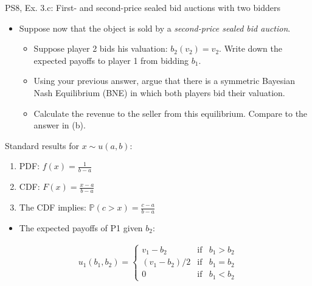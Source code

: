 \begin{frame}{PS8, Ex. 3.c: First- and second-price sealed bid auctions with two bidders}
    \begin{multicols}{2}
      \begin{itemize}
        \item[(c)] Suppose now that the object is sold by a \textit{second-price sealed bid auction}.
        \begin{itemize}\normalsize
          \item[i.]   Suppose player 2 bids his valuation: $b_2(v_2) = v_2$. Write down the expected payoffs to player 1 from bidding $b_1$.
          \item[ii.]  Using your previous answer, argue that there is a symmetric Bayesian Nash Equilibrium (BNE) in which both players bid their valuation.
          \item[iii.] Calculate the revenue to the seller from this equilibrium. Compare to the answer in (b).
        \end{itemize}
      \end{itemize}
      \vspace{-6pt}
      Standard results for $x\sim u(a, b):$
      \vspace{-6pt}
      \begin{enumerate}
        \item[(1)] PDF: $f(x)=\frac{1}{b-a}$
        \item[(2)] CDF: $F(x)=\frac{x-a}{b-a}$
        \item[(3)] The CDF implies: $\mathbb{P}(c>x)=\frac{c-a}{b-a}$
      \end{enumerate}
      \vfill\null\columnbreak
      \begin{itemize}
        \item[(i)] The expected payoffs of P1 given $b_2$:
      \end{itemize}
      \vspace{-12pt}
      \begin{align*}
        u_1(b_1,b_2)=\left\{\begin{array}{lcl}
          v_1-b_2     & \text{if} & b_1>b_2 \\
          (v_1-b_2)/2 & \text{if} & b_1=b_2 \\
          0           & \text{if} & b_1<b_2
        \end{array}\right.
      \end{align*}
      \vspace{-18pt}
      \begin{itemize}

\end{itemize}
\end{multicols}
\end{frame}
